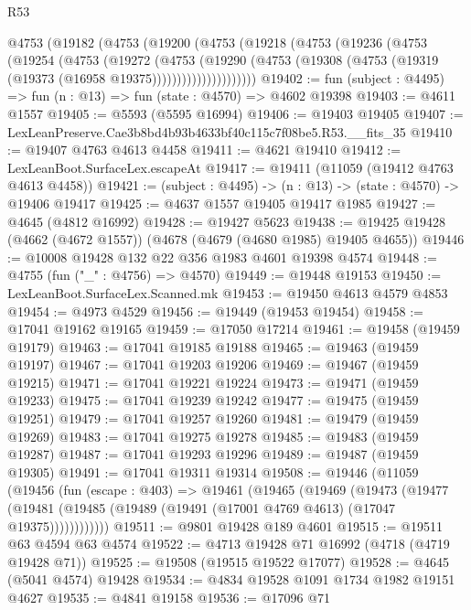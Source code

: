 \begin{lexlean}{R53}
\begin{coremodule}
      @4753
        (@19182
          (@4753
            (@19200
              (@4753
                (@19218
                  (@4753
                    (@19236
                      (@4753
                        (@19254
                          (@4753
                            (@19272
                              (@4753
                                (@19290
                                  (@4753
                                    (@19308
                                      (@4753 (@19319 (@19373 (@16958 @19375)))))))))))))))))))))
@19402 := fun (subject : @4495) => fun (n : @13) => fun (state : @4570) => @4602 @19398
@19403 := @4611 @1557
@19405 := @5593 (@5595 @16994)
@19406 := @19403 @19405
@19407 := LexLeanPreserve.Cae3b8bd4b93b4633bf40c115c7f08be5.R53.__fits_35
@19410 := @19407 @4763 @4613 @4458
@19411 := @4621 @19410
@19412 := LexLeanBoot.SurfaceLex.escapeAt
@19417 := @19411 (@11059 (@19412 @4763 @4613 @4458))
@19421 := (subject : @4495) -> (n : @13) -> (state : @4570) -> @19406 @19417
@19425 := @4637 @1557 @19405 @19417 @1985
@19427 := @4645 (@4812 @16992)
@19428 := @19427 @5623
@19438 := @19425 @19428 (@4662 (@4672 @1557)) (@4678 (@4679 (@4680 @1985) @19405 @4655))
@19446 := @10008 @19428 @132 @22 @356 @1983 @4601 @19398 @4574
@19448 := @4755 (fun ("_" : @4756) => @4570)
@19449 := @19448 @19153
@19450 := LexLeanBoot.SurfaceLex.Scanned.mk
@19453 := @19450 @4613 @4579 @4853
@19454 := @4973 @4529
@19456 := @19449 (@19453 @19454)
@19458 := @17041 @19162 @19165
@19459 := @17050 @17214
@19461 := @19458 (@19459 @19179)
@19463 := @17041 @19185 @19188
@19465 := @19463 (@19459 @19197)
@19467 := @17041 @19203 @19206
@19469 := @19467 (@19459 @19215)
@19471 := @17041 @19221 @19224
@19473 := @19471 (@19459 @19233)
@19475 := @17041 @19239 @19242
@19477 := @19475 (@19459 @19251)
@19479 := @17041 @19257 @19260
@19481 := @19479 (@19459 @19269)
@19483 := @17041 @19275 @19278
@19485 := @19483 (@19459 @19287)
@19487 := @17041 @19293 @19296
@19489 := @19487 (@19459 @19305)
@19491 := @17041 @19311 @19314
@19508 := @19446
    (@11059
      (@19456
        (fun (escape : @403) =>
        @19461
          (@19465
            (@19469
              (@19473
                (@19477
                  (@19481 (@19485 (@19489 (@19491 (@17001 @4769 @4613) (@17047 @19375))))))))))))
@19511 := @9801 @19428 @189 @4601
@19515 := @19511 @63 @4594 @63 @4574
@19522 := @4713 @19428 @71 @16992 (@4718 (@4719 @19428 @71))
@19525 := @19508 (@19515 @19522 @17077)
@19528 := @4645 (@5041 @4574) @19428
@19534 := @4834 @19528 @1091 @1734 @1982 @19151 @4627
@19535 := @4841 @19158
@19536 := @17096 @71

\end{coremodule}
\end{lexlean}
